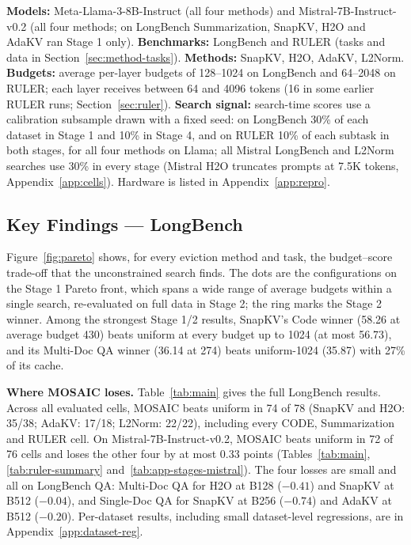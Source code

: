 \documentclass[11pt]{article}
\begin{document}
\textbf{Models:} Meta-Llama-3-8B-Instruct \citep{grattafiori2024llama3} (all four methods) and Mistral-7B-Instruct-v0.2 \citep{jiang2023mistral} (all four methods; on LongBench Summarization, SnapKV, H2O and AdaKV ran Stage 1 only). \textbf{Benchmarks:} LongBench \citep{bai2024longbench} and RULER \citep{hsieh2024ruler} (tasks and data in Section~\ref{sec:method-tasks}). \textbf{Methods:} SnapKV, H2O, AdaKV, L2Norm. \textbf{Budgets:} average per-layer budgets of 128--1024 on LongBench and 64--2048 on RULER; each layer receives between 64 and 4096 tokens (16 in some earlier RULER runs; Section~\ref{sec:ruler}). \textbf{Search signal:} search-time scores use a calibration subsample drawn with a fixed seed: on LongBench 30\% of each dataset in Stage 1 and 10\% in Stage 4, and on RULER 10\% of each subtask in both stages, for all four methods on Llama; all Mistral LongBench and L2Norm searches use 30\% in every stage (Mistral H2O truncates prompts at 7.5K tokens, Appendix~\ref{app:cells}). Hardware is listed in Appendix~\ref{app:repro}.





\subsection{Key Findings — LongBench}
\label{sec:which-stage}

Figure~\ref{fig:pareto} shows, for every eviction method and task, the budget--score trade-off that the unconstrained search finds. The dots are the configurations on the Stage 1 Pareto front, which spans a wide range of average budgets within a single search, re-evaluated on full data in Stage 2; the ring marks the Stage 2 winner. Among the strongest Stage 1/2 results, SnapKV's Code winner (58.26 at average budget 430) beats uniform at every budget up to 1024 (at most 56.73), and its Multi-Doc QA winner (36.14 at 274) beats uniform-1024 (35.87) with 27\% of its cache.

\textbf{Where MOSAIC loses.} Table~\ref{tab:main} gives the full LongBench results. Across all evaluated cells, MOSAIC beats uniform in 74 of 78 (SnapKV and H2O: 35/38; AdaKV: 17/18; L2Norm: 22/22), including every CODE, Summarization and RULER cell. On Mistral-7B-Instruct-v0.2, MOSAIC beats uniform in 72 of 76 cells and loses the other four by at most 0.33 points (Tables~\ref{tab:main}, \ref{tab:ruler-summary} and~\ref{tab:app-stages-mistral}). The four losses are small and all on LongBench QA: Multi-Doc QA for H2O at B128 ($-0.41$) and SnapKV at B512 ($-0.04$), and Single-Doc QA for SnapKV at B256 ($-0.74$) and AdaKV at B512 ($-0.20$). Per-dataset results, including small dataset-level regressions, are in Appendix~\ref{app:dataset-reg}.
\end{document}
